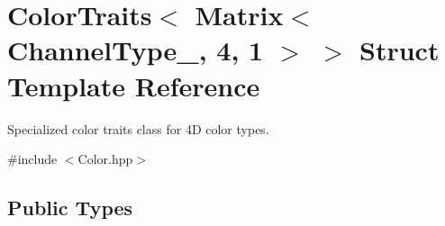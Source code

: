 \hypertarget{struct_d_o_1_1_color_traits_3_01_matrix_3_01_channel_type___00_014_00_011_01_4_01_4}{\section{Color\-Traits$<$ Matrix$<$ Channel\-Type\-\_\-, 4, 1 $>$ $>$ Struct Template Reference}
\label{struct_d_o_1_1_color_traits_3_01_matrix_3_01_channel_type___00_014_00_011_01_4_01_4}
}


Specialized color traits class for 4\-D color types.  




{\ttfamily \#include $<$Color.\-hpp$>$}

\subsection*{Public Types}
